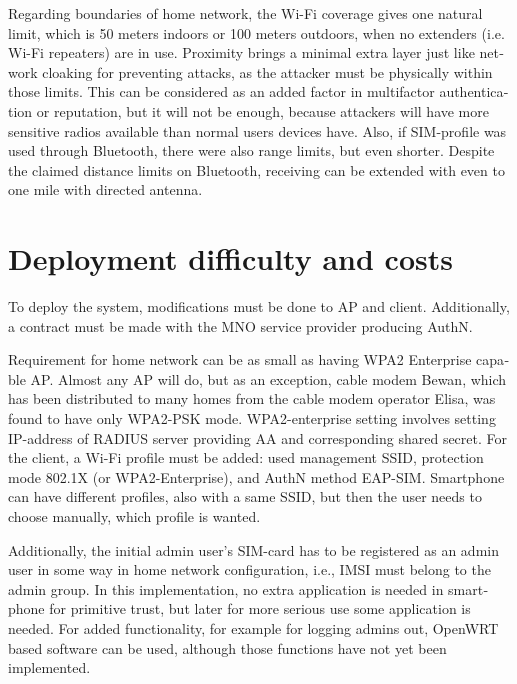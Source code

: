 \documentclass[12pt,a4paper,english]{tutthesis}
\begin{document}
\begin{otherlanguage}{english}
Regarding boundaries of home network, the Wi-Fi coverage gives 
one natural limit, which is 50 meters indoors or 100 meters outdoors,
when no extenders (i.e. Wi-Fi repeaters) are in use.
Proximity brings a minimal extra layer just like network cloaking 
for preventing attacks, as the attacker must be physically within
those limits.
This can be considered as an added factor in multifactor
authentication or reputation, but it will not be enough, because
attackers will have more sensitive  radios available than normal users
devices have. 
Also, if SIM-profile was used through Bluetooth, there were also
range limits, but even shorter. Despite the claimed distance limits
on Bluetooth, receiving can be extended with even to one mile with
directed antenna\cite{SANS-bluetooth-2007}.




\section{Deployment difficulty and costs}
\label{sec-6-2}

To deploy the system, modifications must be done to AP and client.
Additionally, a contract must be made with the MNO service
provider producing AuthN.

Requirement for home network can be as small as having WPA2 Enterprise capable
AP. Almost any AP will do, but as an exception, cable modem Bewan, which 
has been distributed to many homes from the cable modem operator Elisa, was found to have only WPA2-PSK mode.
WPA2-enterprise setting involves setting IP-address of RADIUS server providing 
AA and corresponding shared secret.
For  the client, a Wi-Fi profile must be added: used management SSID,
protection mode 802.1X (or WPA2-Enterprise), and AuthN method EAP-SIM.
Smartphone can have different profiles, also with a same SSID, but
then the user needs to choose manually, which profile is wanted.

Additionally, the initial admin user's SIM-card has to be registered as an
admin user in some way in home network 
configuration, i.e., IMSI must belong to the admin group.
In this implementation, no extra application is needed in smartphone
for primitive trust, but later for more serious use some application is needed.
For added functionality, for example for logging admins out, OpenWRT
based software can be used, although those functions have not yet been
implemented.






\end{otherlanguage}
\end{document}

